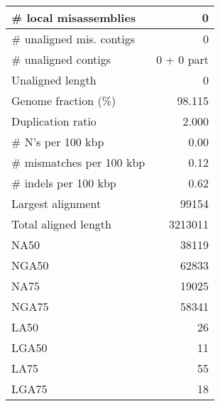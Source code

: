 \documentclass[12pt,a4paper]{article}
\begin{document}
\begin{table}[ht]
\begin{center}
\begin{tabular}{|l*{1}{|r}|}
\# local misassemblies & 0 \\ \hline
\# unaligned mis. contigs & 0 \\ \hline
\# unaligned contigs & 0 + 0 part \\ \hline
Unaligned length & 0 \\ \hline
Genome fraction (\%) & 98.115 \\ \hline
Duplication ratio & 2.000 \\ \hline
\# N's per 100 kbp & 0.00 \\ \hline
\# mismatches per 100 kbp & 0.12 \\ \hline
\# indels per 100 kbp & 0.62 \\ \hline
Largest alignment & 99154 \\ \hline
Total aligned length & 3213011 \\ \hline
NA50 & 38119 \\ \hline
NGA50 & 62833 \\ \hline
NA75 & 19025 \\ \hline
NGA75 & 58341 \\ \hline
LA50 & 26 \\ \hline
LGA50 & 11 \\ \hline
LA75 & 55 \\ \hline
LGA75 & 18 \\ \hline
\end{tabular}
\end{center}
\end{table}
\end{document}
